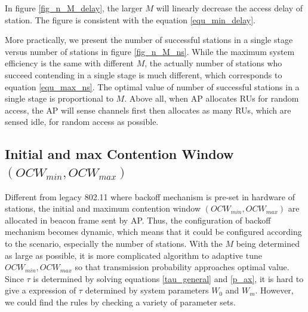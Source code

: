 In figure \ref{fig_n_M_delay}, the larger $M$ will linearly decrease the access delay of station. The figure is consistent with the equation \ref{equ_min_delay}. 

More practically, we present the number of successful stations in a single stage versus number of stations in figure \ref{fig_n_M_ns}.
While the maximum system efficiency is the same with different $M$, the actually number of stations who succeed contending in a single stage is much different, which corresponds to equation \ref{equ_max_ns}. 
The optimal value of number of successful stations in a single stage is proportional to $M$. 
Above all, when AP allocates RUs for random access, the AP will sense channels first then allocates as many RUs, which are sensed idle, for random access as possible.



\subsection{Initial and max Contention Window $(OCW_{min}, OCW_{max})$}
\label{contend_window}
Different from legacy 802.11 where backoff mechanism is pre-set in hardware of stations, the initial and maximum contention window $(OCW_{min}, OCW_{max})$ are allocated in beacon frame sent by AP. 
Thus, the configuration of backoff mechanism becomes dynamic, which means that it could be configured according to the scenario, especially the number of stations.
With the $M$ being determined as large as possible, it is more complicated algorithm to adaptive tune $OCW_{min}, OCW_{max}$ so that transmission probability approaches optimal value.
Since $\tau$ is determined by solving equations \ref{tau_general} and \ref{p_ax}, it is hard to give a expression of $\tau$ determined by system parameters $W_0$ and $W_m$.
However, we could find the rules by checking a variety of parameter sets.

